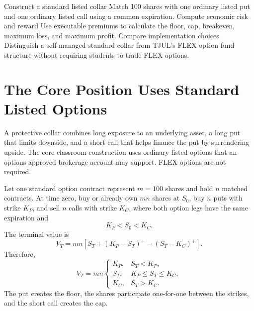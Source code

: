 \documentclass[11pt]{article}
\begin{document}

\learningobjectives
  {Construct a standard listed collar}
  {Match 100 shares with one ordinary listed put and one ordinary listed call using a common expiration.}
  {Compute economic risk and reward}
  {Use executable premiums to calculate the floor, cap, breakeven, maximum loss, and maximum profit.}
  {Compare implementation choices}
  {Distinguish a self-managed standard collar from TJUL's FLEX-option fund structure without requiring students to trade FLEX options.}

\section{The Core Position Uses Standard Listed Options}

A protective collar combines long exposure to an underlying asset, a long put
that limits downside, and a short call that helps finance the put by surrendering
upside. The core classroom construction uses ordinary listed options that an
options-approved brokerage account may support. FLEX options are not required.

Let one standard option contract represent $m=100$ shares and hold $n$ matched
contracts. At time zero, buy or already own $mn$ shares at $S_0$, buy $n$ puts
with strike $K_P$, and sell $n$ calls with strike $K_C$, where both option legs
have the same expiration and
\begin{equation}
  \label{eq:strike-order}
  K_P<S_0<K_C.
\end{equation}
The terminal value is
\begin{equation}
  \label{eq:collar-value}
  V_T=mn\left[S_T+(K_P-S_T)^+-(S_T-K_C)^+\right].
\end{equation}
Therefore,
\begin{equation}
  \label{eq:collar-piecewise}
  V_T=mn
  \begin{cases}
    K_P, & S_T<K_P,\\
    S_T, & K_P\leq S_T\leq K_C,\\
    K_C, & S_T>K_C.
  \end{cases}
\end{equation}
The put creates the floor, the shares participate one-for-one between the
strikes, and the short call creates the cap.
\end{document}
